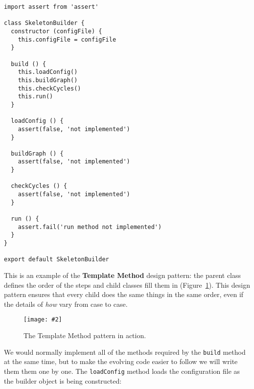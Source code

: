 \documentclass[krantzl]{krantz}
\newcommand{\figpdf}[4]{\begin{figure}%
\centering%
\texttt{[image: \#2]}%
\caption{#3}%
\label{#1}%
\end{figure}}
\newcommand{\figref}[1]{Figure~\ref{#1}}
\newcommand{\glossref}[1]{\textbf{#1}}
\begin{document}
\begin{lstlisting}[frame=single,frameround=tttt]
import assert from 'assert'

class SkeletonBuilder {
  constructor (configFile) {
    this.configFile = configFile
  }

  build () {
    this.loadConfig()
    this.buildGraph()
    this.checkCycles()
    this.run()
  }

  loadConfig () {
    assert(false, 'not implemented')
  }

  buildGraph () {
    assert(false, 'not implemented')
  }

  checkCycles () {
    assert(false, 'not implemented')
  }

  run () {
    assert.fail('run method not implemented')
  }
}

export default SkeletonBuilder
\end{lstlisting}



This is an example of
the \glossref{Template Method} design pattern:
the parent class defines the order of the steps
and child classes fill them in
(\figref{build-manager-template-method}).
This design pattern ensures that every child does the same things in the same order,
even if the details of \emph{how} vary from case to case.

\figpdf{build-manager-template-method}{./build-manager/template-method.pdf}{The Template Method pattern in action.}{0.6}


We would normally implement all of the methods required by the \texttt{build} method at the same time,
but to make the evolving code easier to follow we will write them them one by one.
The \texttt{loadConfig} method loads the configuration file
as the builder object is being constructed:
\end{document}
